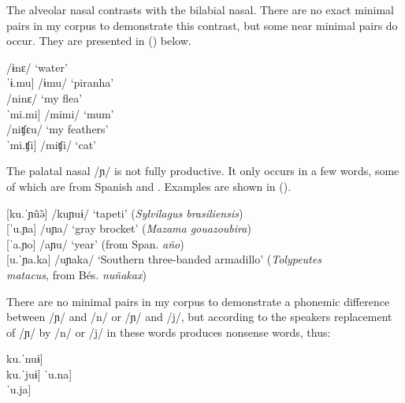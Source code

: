 The alveolar nasal contrasts with the bilabial nasal. There are no exact minimal pairs in my corpus to demonstrate this contrast, but some near minimal pairs do occur. They are presented in () below.

\ea\label{ex:n-m}
\ea     \tab[ˈɨ.nɛ] \tab\tab /ɨnɛ/ \tab\tab ‘water’\\
     \tab{[}ˈɨ.mu] \tab /ɨmu/ \tab\tab ‘piranha’\\
\ex     \tab[ˈni.nə] \tab /ninɛ/ \tab ‘my flea’\\
     \tab{[}ˈmi.mi] \tab /mimi/ \tab ‘mum’\\
\ex     {} \tab /niʧɛu/ \tab ‘my feathers’\\
     \tab{[}ˈmi.ʧi] \tab /miʧi/ \tab ‘cat’\\%
\z
\xe
   
The palatal nasal /ɲ/ is not fully productive. It only occurs in a few words, some of which are from Spanish and . Examples are shown in ().


\ea\label{ex:ñ} %
    [ku.ˈɲũə̃] \tab  /kuɲuɨ/ \tab  ‘tapeti’ (\textit{Sylvilagus brasiliensis})\\
    {[}ˈu.ɲa] \tab  /uɲa/ \tab\tab  ‘gray brocket’ (\textit{Mazama gouazoubira}) \\
     {[}ˈa.ɲo] \tab  /aɲu/ \tab\tab  ‘year’ (from Span. \textit{año}) \\
      {[}u.ˈɲa.ka] \tab  /uɲaka/ \tab  ‘Southern three-banded armadillo’ (\textit{Tolypeutes} \\
     \tab \tab \tab \tab  \textit{matacus}, from Bés. \textit{nuñakax}) \\%
 \xe
     
There are no minimal pairs in my corpus to demonstrate a phonemic difference between /ɲ/ and /n/ or /ɲ/ and /j/, but according to the speakers replacement of /ɲ/ by /n/ or /j/ in these words produces nonsense words, thus:


\ea\label{ex:ñ-Sternchen}
\ea     \tab*{[}ku.ˈnuɨ] \\
\tab*{[}ku.ˈjuɨ]
\ex     \tab*{[}ˈu.na] \\
\tab*{[}ˈu.ja]
\z
\xe



